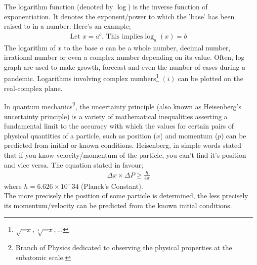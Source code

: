 \begin{mathbox}{}
{The {logarithm} function (denoted by $\log$) is the {inverse} function of {exponentiation}. It denotes the {exponent/power} to which the {'base'} has been raised to in a number. Here's an example;
\begin{align*}
    \text{Let } x = a^b. \text{ This implies} \log_a (x) = b
\end{align*}
The logarithm of $x$ to the base $a$ can be a {whole number, decimal number, irrational number} or even a {complex number} depending on its value. Often, log graph are used to make growth, forecast and even the number of cases during a pandemic. Logarithms involving complex numbers\footnote{\sffamily${\sqrt{-x}, \sqrt[3]{-x}, \dots}$} $(i)$ can be plotted on the real-complex plane.}
\end{mathbox}
\begin{phybox}{}
{In quantum mechanics\footnote{Branch of Physics dedicated to observing the physical properties at the subatomic scale.}, the uncertainty principle (also known as Heisenberg's uncertainty principle) is a variety of mathematical inequalities asserting a fundamental limit to the accuracy with which the values for certain pairs of physical quantities of a particle, such as position ($x$) and momentum ($p$) can be predicted from initial or known conditions. Heisenberg, in simple words stated that if you know velocity/momentum of the particle, you can't find it's position and vice versa. The equation stated in favour;
\begin{align*}
    \Delta x \times \Delta P \geq \frac{h}{4\pi}
\end{align*}
where  $h = 6.626 \times 10^-34$ (Planck's Constant).\\
The more precisely the position of some particle is determined, the less precisely its momentum/velocity can be predicted from the known initial conditions.}
\end{phybox}
